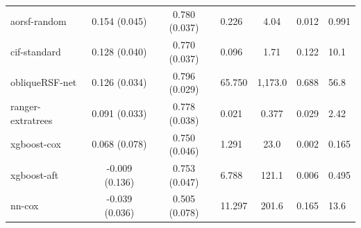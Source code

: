 \documentclass[twoside,11pt]{article}\usepackage[]{graphicx}\usepackage[]{xcolor}
\newenvironment{knitrout}{}{} %
\begin{document}
\begin{knitrout}
\begin{longtable}{lcclccl}
\hspace{1em}aorsf-random & 0.154 (0.045) & 0.780 (0.037) & 0.226 & 4.04 & 0.012 & 0.991\\
\hspace{1em}cif-standard & 0.128 (0.040) & 0.770 (0.037) & 0.096 & 1.71 & 0.122 & 10.1\\
\hspace{1em}obliqueRSF-net & 0.126 (0.034) & 0.796 (0.029) & 65.750 & 1,173.0 & 0.688 & 56.8\\
\hspace{1em}ranger-extratrees & 0.091 (0.033) & 0.778 (0.038) & 0.021 & 0.377 & 0.029 & 2.42\\
\hspace{1em}xgboost-cox & 0.068 (0.078) & 0.750 (0.046) & 1.291 & 23.0 & 0.002 & 0.165\\
\hspace{1em}xgboost-aft & -0.009 (0.136) & 0.753 (0.047) & 6.788 & 121.1 & 0.006 & 0.495\\
\hspace{1em}nn-cox & -0.039 (0.036) & 0.505 (0.078) & 11.297 & 201.6 & 0.165 & 13.6\\*
\end{longtable}

\end{knitrout}


\vskip 0.2in

\end{document}
